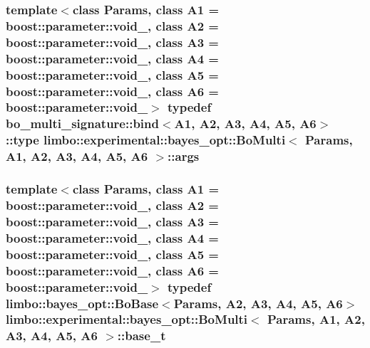 \subsubsection[{args}]{\setlength{\rightskip}{0pt plus 5cm}template$<$class Params, class A1 = boost\+::parameter\+::void\+\_\+, class A2 = boost\+::parameter\+::void\+\_\+, class A3 = boost\+::parameter\+::void\+\_\+, class A4 = boost\+::parameter\+::void\+\_\+, class A5 = boost\+::parameter\+::void\+\_\+, class A6 = boost\+::parameter\+::void\+\_\+$>$ typedef bo\+\_\+multi\+\_\+signature\+::bind$<$A1, A2, A3, A4, A5, A6$>$\+::type {\bf limbo\+::experimental\+::bayes\+\_\+opt\+::\+Bo\+Multi}$<$ Params, A1, A2, A3, A4, A5, A6 $>$\+::{\bf args}}\label{classlimbo_1_1experimental_1_1bayes__opt_1_1_bo_multi_afbec2602c4a22ad0a1285cc813a51c58}
\hypertarget{classlimbo_1_1experimental_1_1bayes__opt_1_1_bo_multi_a62d938e4735374911ea55c4b4f8a6562}{}
\subsubsection[{base\+\_\+t}]{\setlength{\rightskip}{0pt plus 5cm}template$<$class Params, class A1 = boost\+::parameter\+::void\+\_\+, class A2 = boost\+::parameter\+::void\+\_\+, class A3 = boost\+::parameter\+::void\+\_\+, class A4 = boost\+::parameter\+::void\+\_\+, class A5 = boost\+::parameter\+::void\+\_\+, class A6 = boost\+::parameter\+::void\+\_\+$>$ typedef {\bf limbo\+::bayes\+\_\+opt\+::\+Bo\+Base}$<$Params, A2, A3, A4, A5, A6$>$ {\bf limbo\+::experimental\+::bayes\+\_\+opt\+::\+Bo\+Multi}$<$ Params, A1, A2, A3, A4, A5, A6 $>$\+::{\bf base\+\_\+t}}\label{classlimbo_1_1experimental_1_1bayes__opt_1_1_bo_multi_a62d938e4735374911ea55c4b4f8a6562}
\hypertarget{classlimbo_1_1experimental_1_1bayes__opt_1_1_bo_multi_a94e37f45e30ac591bacf36df6767d6ad}{}
